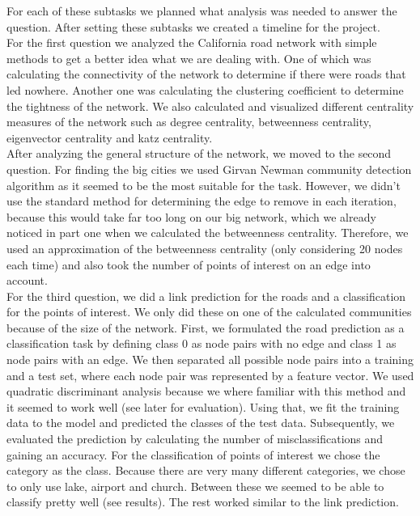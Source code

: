 \documentclass[11pt]{article}
\begin{document}
For each of these subtasks we planned what analysis was needed to answer the question. After setting these subtasks we created a timeline for the project. 
\\
For the first question we analyzed the California road network with simple methods to get a better idea what we are dealing with. One of which was calculating the connectivity of the network to determine if there were roads that led nowhere. Another one was calculating the clustering coefficient to determine the tightness of the network. We also calculated and visualized different centrality measures of the network such as degree centrality, betweenness centrality, eigenvector centrality and katz centrality. 
\\
After analyzing the general structure of the network, we moved to the second question. For finding the big cities we used Girvan Newman community detection algorithm as it seemed to be the most suitable for the task. However, we didn't use the standard method for determining the edge to remove in each iteration, because this would take far too long on our big network, which we already noticed in part one when we calculated the betweenness centrality. Therefore, we used an approximation of the betweenness centrality (only considering 20 nodes each time) and also took the number of points of interest on an edge into account.
\\
For the third question, we did a link prediction for the roads and a classification for the points of interest. We only did these on one of the calculated communities because of the size of the network. 
First, we formulated the road prediction as a classification task by defining class 0 as node pairs with no edge and class 1 as node pairs with an edge. We then separated all possible node pairs into a training and a test set, where each node pair was represented by a feature vector. We used quadratic discriminant analysis because we where familiar with this method and it seemed to work well (see later for evaluation). Using that, we fit the training data to the model and predicted the classes of the test data. Subsequently, we evaluated the prediction by calculating the number of misclassifications and gaining an accuracy. 
For the classification of points of interest we chose the category as the class. Because there are very many different categories, we chose to only use lake, airport and church. Between these we seemed to be able to classify pretty well (see results). The rest worked similar to the link prediction. 
\\
\end{document}
